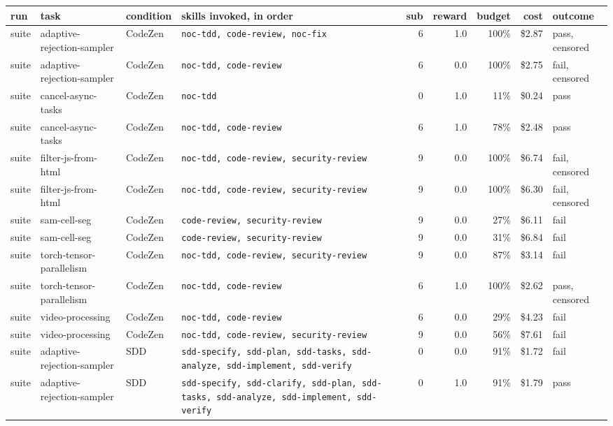 
\begin{tabular}{@{}llllrrrrl@{}}
\toprule
run & task & condition & skills invoked, in order & sub & reward & budget & cost & outcome \\
\midrule
suite & adaptive-rejection-sampler & CodeZen & \texttt{\footnotesize noc-tdd, code-review, noc-fix} & 6 & 1.0 & 100\% & \$2.87 & pass, censored \\
suite & adaptive-rejection-sampler & CodeZen & \texttt{\footnotesize noc-tdd, code-review} & 6 & 0.0 & 100\% & \$2.75 & fail, censored \\
suite & cancel-async-tasks & CodeZen & \texttt{\footnotesize noc-tdd} & 0 & 1.0 & 11\% & \$0.24 & pass \\
suite & cancel-async-tasks & CodeZen & \texttt{\footnotesize noc-tdd, code-review} & 6 & 1.0 & 78\% & \$2.48 & pass \\
suite & filter-js-from-html & CodeZen & \texttt{\footnotesize noc-tdd, code-review, security-review} & 9 & 0.0 & 100\% & \$6.74 & fail, censored \\
suite & filter-js-from-html & CodeZen & \texttt{\footnotesize noc-tdd, code-review, security-review} & 9 & 0.0 & 100\% & \$6.30 & fail, censored \\
suite & sam-cell-seg & CodeZen & \texttt{\footnotesize code-review, security-review} & 9 & 0.0 & 27\% & \$6.11 & fail \\
suite & sam-cell-seg & CodeZen & \texttt{\footnotesize code-review, security-review} & 9 & 0.0 & 31\% & \$6.84 & fail \\
suite & torch-tensor-parallelism & CodeZen & \texttt{\footnotesize noc-tdd, code-review, security-review} & 9 & 0.0 & 87\% & \$3.14 & fail \\
suite & torch-tensor-parallelism & CodeZen & \texttt{\footnotesize noc-tdd, code-review} & 6 & 1.0 & 100\% & \$2.62 & pass, censored \\
suite & video-processing & CodeZen & \texttt{\footnotesize noc-tdd, code-review} & 6 & 0.0 & 29\% & \$4.23 & fail \\
suite & video-processing & CodeZen & \texttt{\footnotesize noc-tdd, code-review, security-review} & 9 & 0.0 & 56\% & \$7.61 & fail \\
suite & adaptive-rejection-sampler & SDD & \texttt{\footnotesize sdd-specify, sdd-plan, sdd-tasks, sdd-analyze, sdd-implement, sdd-verify} & 0 & 0.0 & 91\% & \$1.72 & fail \\
suite & adaptive-rejection-sampler & SDD & \texttt{\footnotesize sdd-specify, sdd-clarify, sdd-plan, sdd-tasks, sdd-analyze, sdd-implement, sdd-verify} & 0 & 1.0 & 91\% & \$1.79 & pass \\

\end{tabular}
